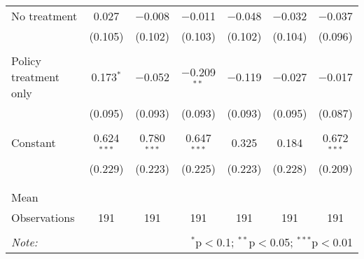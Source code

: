 \begin{tabular}{@{\extracolsep{5pt}}lcccccc}
 No treatment & 0.027 & $-$0.008 & $-$0.011 & $-$0.048 & $-$0.032 & $-$0.037 \\ 
  & (0.105) & (0.102) & (0.103) & (0.102) & (0.104) & (0.096) \\ 
  & & & & & & \\ 
 Policy treatment only & 0.173$^{*}$ & $-$0.052 & $-$0.209$^{**}$ & $-$0.119 & $-$0.027 & $-$0.017 \\ 
  & (0.095) & (0.093) & (0.093) & (0.093) & (0.095) & (0.087) \\ 
  & & & & & & \\ 
 Constant & 0.624$^{***}$ & 0.780$^{***}$ & 0.647$^{***}$ & 0.325 & 0.184 & 0.672$^{***}$ \\ 
  & (0.229) & (0.223) & (0.225) & (0.223) & (0.228) & (0.209) \\ 
  & & & & & & \\ 
\hline \\[-1.8ex] 
Mean &  &  &  &  &  &  \\ 
Observations & 191 & 191 & 191 & 191 & 191 & 191 \\ 
\hline 
\hline \\[-1.8ex] 
\textit{Note:}  & \multicolumn{6}{r}{$^{*}$p$<$0.1; $^{**}$p$<$0.05; $^{***}$p$<$0.01} \\ 
\end{tabular} 

